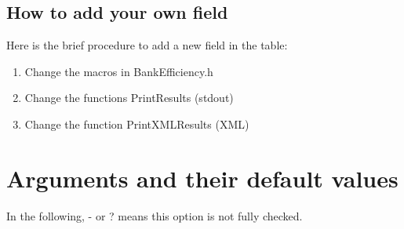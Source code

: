 \documentclass[a4paper,10pt]{article}
\begin{document}
\subsection{How to add your own field}
Here is the brief procedure to add a new field in the table:
\begin{enumerate}
 \item Change the macros in BankEfficiency.h
 \item Change the functions PrintResults (stdout)
 \item Change the function  PrintXMLResults (XML)
\end{enumerate}


\section{Arguments and their default values}\label{default}
In the following, - or ? means this option is not fully checked.
\end{document}
